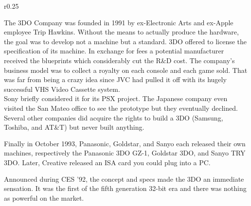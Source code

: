 \begin{wrapfigure}[14]{r}{0.25\textwidth}{
\centering {}}
\end{wrapfigure}
The 3DO Company was founded in 1991 by ex-Electronic Arts and ex-Apple employee Trip Hawkins. Without the means to actually produce the hardware, the goal was to develop not a machine but a standard. 3DO offered to license the specification of its machine. In exchange for fees a potential manufacturer received the blueprints which considerably cut the R\&D cost. The company's business model was to collect a royalty on each console and each game sold. That was far from being a crazy idea since JVC had pulled it off with its hugely successful VHS Video Cassette system.\\

 Sony briefly considered it for its PSX project. The Japanese company even visited the San Mateo office to see the prototype but they eventually declined. Several other companies did acquire the rights to build a 3DO (Samsung, Toshiba, and AT\&T) but never built anything.\\
 \par
Finally in October 1993, Panasonic, Goldstar, and Sanyo each released their own machines, respectively the Panasonic 3DO GZ-1, Goldstar 3DO, and Sanyo TRY 3DO. Later, Creative released an ISA card you could plug into a PC.\\
\par
{}
\par
\vspace{-5pt}

















Announced during CES '92, the concept and specs made the 3DO an immediate sensation. It was the first of the fifth generation 32-bit era and there was nothing as powerful on the market.\\
\par


\\

